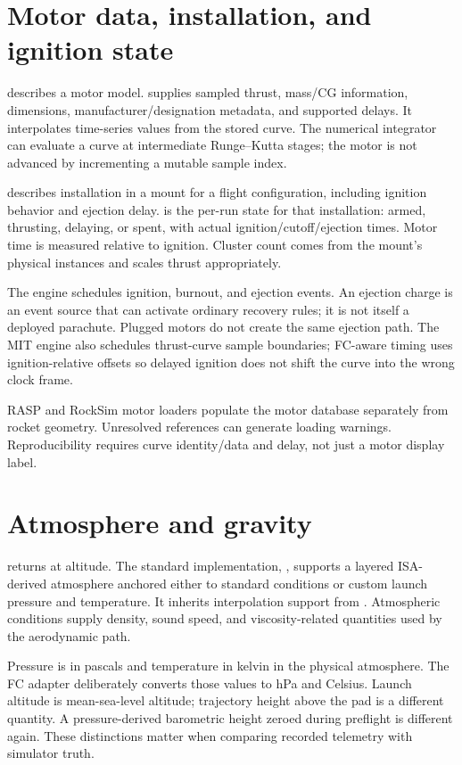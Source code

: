 \section{Motor data, installation, and ignition state}
 describes a motor model.  supplies sampled thrust, mass/CG information, dimensions, manufacturer/designation metadata, and supported delays. It interpolates time-series values from the stored curve. The numerical integrator can evaluate a curve at intermediate Runge--Kutta stages; the motor is not advanced by incrementing a mutable sample index.

 describes installation in a mount for a flight configuration, including ignition behavior and ejection delay.  is the per-run state for that installation: armed, thrusting, delaying, or spent, with actual ignition/cutoff/ejection times. Motor time is measured relative to ignition. Cluster count comes from the mount's physical instances and scales thrust appropriately.

The engine schedules ignition, burnout, and ejection events. An ejection charge is an event source that can activate ordinary recovery rules; it is not itself a deployed parachute. Plugged motors do not create the same ejection path. The MIT engine also schedules thrust-curve sample boundaries; FC-aware timing uses ignition-relative offsets so delayed ignition does not shift the curve into the wrong clock frame.

RASP  and RockSim motor loaders populate the motor database separately from rocket geometry. Unresolved references can generate loading warnings. Reproducibility requires curve identity/data and delay, not just a motor display label.

\section{Atmosphere and gravity}
 returns  at altitude. The standard implementation, , supports a layered ISA-derived atmosphere anchored either to standard conditions or custom launch pressure and temperature. It inherits interpolation support from . Atmospheric conditions supply density, sound speed, and viscosity-related quantities used by the aerodynamic path.

Pressure is in pascals and temperature in kelvin in the physical atmosphere. The FC adapter deliberately converts those values to hPa and Celsius. Launch altitude is mean-sea-level altitude; trajectory height above the pad is a different quantity. A pressure-derived barometric height zeroed during preflight is different again. These distinctions matter when comparing recorded telemetry with simulator truth.


